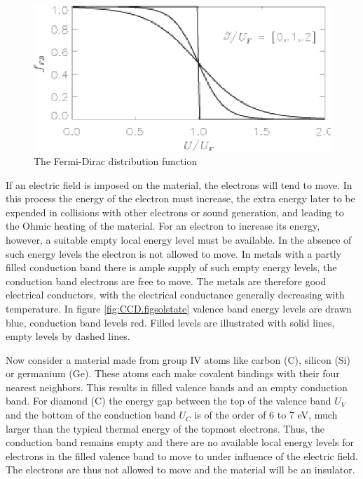 \begin{figure}[h]
  \centering
	\includegraphics{CCD_fFD.eps}
  \caption{The Fermi-Dirac distribution function}
  \label{fig:CCD.figfFD}
\end{figure}

If an electric field is imposed on the material, the electrons will
tend to move. In this process the energy of the electron must
increase, the extra energy later to be expended in collisions with
other electrons or sound generation, and leading to the Ohmic heating
of the material. For an electron to increase its energy, however, a
suitable empty local energy level must be available. In the absence of
such energy levels the electron is not allowed to move. In metals with
a partly filled conduction band there is ample supply of such empty
energy levels, the conduction band electrons are free to move. The
metals are therefore good electrical conductors, with the electrical
conductance generally decreasing with temperature. In figure
\ref{fig:CCD.figsolstate} valence band energy levels are drawn blue,
conduction band levels red. Filled levels are illustrated with
solid lines, empty levels by dashed lines. 


Now consider a material made from group IV atoms like carbon (C),
silicon (Si) or germanium (Ge).  These atoms each make covalent
bindings with their four nearest neighbors. This results in filled
valence bands and an empty conduction band.  For diamond (C) the
energy gap between the top of the valence band $U_V$ and the bottom of
the conduction band $U_C$ is of the order of 6 to 7 eV, much larger
than the typical thermal energy of the topmost electrons. Thus, the
conduction band remains empty and there are no available local energy
levels for electrons in the filled valence band to move to under
influence of the electric field. The electrons are thus not allowed to
move and the material will be an insulator.

